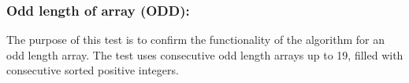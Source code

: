 \documentclass[12pt]{article}
\begin{document}
\subsubsection{Odd length of array (ODD): }
The purpose of this test is to confirm the functionality of the algorithm for an odd length array. The test uses consecutive odd length arrays up to 19, filled with consecutive sorted positive integers.
\begin{table}[H]
	\centering
	\caption{Odd length of array elements test results.}
	\label{my-label}
\end{table}
\end{document}
